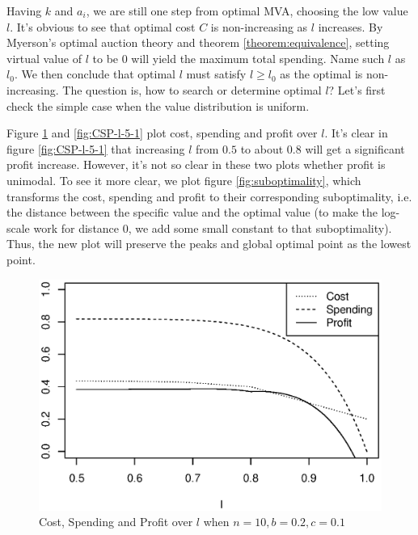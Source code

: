 Having $k$ and $a_i$, we are still one step from optimal MVA, choosing the low
value $l$. It's obvious to see that optimal cost $C$ is non-increasing as $l$
increases. By Myerson's optimal auction theory and theorem
\ref{theorem:equivalence}, setting virtual value of $l$ to be $0$ will yield
the maximum total spending. Name such $l$ as $l_0$. We then conclude that
optimal $l$ must satisfy $l \geq l_0$ as the optimal is non-increasing. The
question is, how to search or determine optimal $l$? Let's first check the simple
case when the value distribution is uniform.

Figure \ref{fig:CSP-l-2-1} and \ref{fig:CSP-l-5-1} plot cost, spending and profit
over $l$. It's clear in figure \ref{fig:CSP-l-5-1} that increasing $l$ from $0.5$ to about $0.8$
will get a significant profit increase. However, it's not so clear in these two plots
whether profit is unimodal. To see it more clear, we plot figure \ref{fig:suboptimality},
which transforms the cost, spending and profit to their corresponding suboptimality, i.e.
the distance between the specific value and the optimal value (to make the log-scale work
for distance $0$, we add some small constant to that suboptimality). Thus, the new plot will
preserve the peaks and global optimal point as the lowest point.

\begin{figure}
\centering
    \includegraphics[trim=0mm 5mm 5mm 15mm, clip, width=\linewidth]{figures/10-0.200000-0.100000.eps}
    \caption{Cost, Spending and Profit over $l$ when $n = 10, b = 0.2, c = 0.1$}\label{fig:CSP-l-2-1}
\end{figure}

